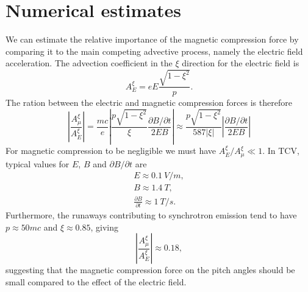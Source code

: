 \documentclass{notes}
\begin{document}
	\section*{Numerical estimates}
	We can estimate the relative importance of the magnetic compression force by
	comparing it to the main competing advective process, namely the electric
	field acceleration. The advection coefficient in the $\xi$ direction for the
	electric field is
	\begin{equation}
		A^\xi_E = eE\frac{\sqrt{1-\xi^2}}{p}.
	\end{equation}
	The ration between the electric and magnetic compression forces is
	therefore
	\begin{equation}
		\left|\frac{A^\xi_\mu}{A^\xi_E}\right| =
			\frac{mc}{e}
			\left|\frac{p\sqrt{1-\xi^2}}{\xi}\frac{\partial B/\partial t}{2EB}\right|
			\approx
			\frac{p\sqrt{1-\xi^2}}{587\left|\xi\right|}\left|\frac{\partial B/\partial t}{2EB}\right|
	\end{equation}
	For magnetic compression to be negligible we must have
	$A^\xi_E/A^\xi_\mu\ll 1$. In TCV, typical values for $E$, $B$ and
	$\partial B/\partial t$ are
	\begin{equation*}
		\begin{aligned}
			E\approx\SI{0.1}{V/m},\\
			B\approx\SI{1.4}{T},\\
			\frac{\partial B}{\partial t}\approx\SI{1}{T/s}.
		\end{aligned}
	\end{equation*}
	Furthermore, the runaways contributing to synchrotron emission tend to have
	$p\approx 50mc$ and $\xi\approx 0.85$, giving
	\begin{equation}
		\left|\frac{A^\xi_\mu}{A^\xi_E}\right| \approx
			0.18,
	\end{equation}
	suggesting that the magnetic compression force on the pitch angles should be
	small compared to the effect of the electric field.
\end{document}
